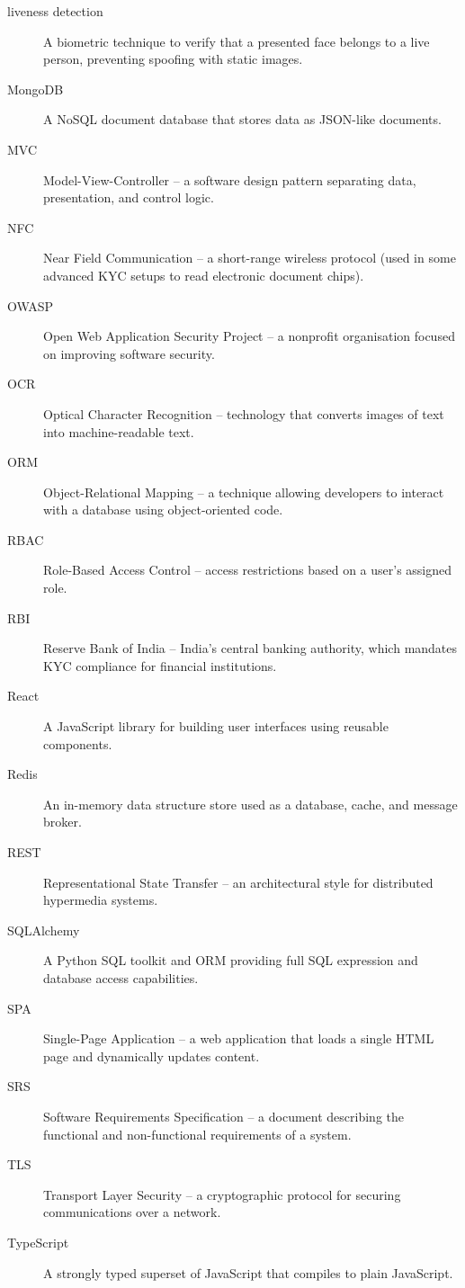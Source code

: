 \begin{description}
    \item[liveness detection] A biometric technique to verify that a presented face belongs to a live person, preventing spoofing with static images.
    \item[MongoDB] A NoSQL document database that stores data as JSON-like documents.
    \item[MVC] Model-View-Controller -- a software design pattern separating data, presentation, and control logic.
    \item[NFC] Near Field Communication -- a short-range wireless protocol (used in some advanced KYC setups to read electronic document chips).
    \item[OWASP] Open Web Application Security Project -- a nonprofit organisation focused on improving software security.
    \item[OCR] Optical Character Recognition -- technology that converts images of text into machine-readable text.
    \item[ORM] Object-Relational Mapping -- a technique allowing developers to interact with a database using object-oriented code.
    \item[RBAC] Role-Based Access Control -- access restrictions based on a user's assigned role.
    \item[RBI] Reserve Bank of India -- India's central banking authority, which mandates KYC compliance for financial institutions.
    \item[React] A JavaScript library for building user interfaces using reusable components.
    \item[Redis] An in-memory data structure store used as a database, cache, and message broker.
    \item[REST] Representational State Transfer -- an architectural style for distributed hypermedia systems.
    \item[SQLAlchemy] A Python SQL toolkit and ORM providing full SQL expression and database access capabilities.
    \item[SPA] Single-Page Application -- a web application that loads a single HTML page and dynamically updates content.
    \item[SRS] Software Requirements Specification -- a document describing the functional and non-functional requirements of a system.
    \item[TLS] Transport Layer Security -- a cryptographic protocol for securing communications over a network.
    \item[TypeScript] A strongly typed superset of JavaScript that compiles to plain JavaScript.

\end{description}
